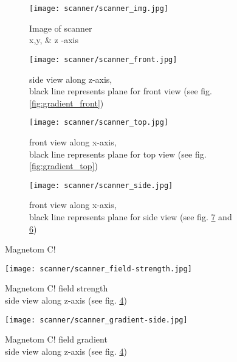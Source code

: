 \begin{figure}[!htb]
\centering
  \begin{subfigure}[b]{0.4\textwidth}
	\centering
	\texttt{[image: scanner/scanner\_img.jpg]}
	\caption{Image of scanner\\ x,y, \& z -axis}
	\label{fig:scanner_image}
  \end{subfigure}
    \hfill
  \begin{subfigure}[b]{0.4\textwidth}
  	\centering
    \texttt{[image: scanner/scanner\_front.jpg]}
    \caption{side view along z-axis,\\ black line represents plane for front view (see fig. \ref{fig:gradient_front})}
    \label{fig:scanner_front}
  \end{subfigure}
  
  \begin{subfigure}[b]{0.4\textwidth}
   	\centering
   	\texttt{[image: scanner/scanner\_top.jpg]}
   	\caption{front view along x-axis,\\ black line represents plane for top view (see fig. \ref{fig:gradient_top})}
   	\label{fig:scanner_top}
  \end{subfigure}
    \hfill
  \begin{subfigure}[b]{0.4\textwidth}
  	\centering
  	\texttt{[image: scanner/scanner\_side.jpg]}
  	\caption{front view along x-axis,\\ black line represents plane for side view (see fig. \ref{fig:gradient_side} and \ref{fig:strength_side})}
  	\label{fig:scanner_side}
  \end{subfigure}
  \caption{Magnetom C! \cite{magnetom_handbook}}
  \label{fig:scanner}
\end{figure}

\begin{figure}[!htb]
  	\centering
      \texttt{[image: scanner/scanner\_field-strength.jpg]}
      \caption{Magnetom C! field strength\\ side view along z-axis (see fig. \ref{fig:scanner_side}) \cite{magnetom_handbook}}
    \label{fig:strength_side}
\end{figure}

\begin{figure}[!htb]
    	\centering
        \texttt{[image: scanner/scanner\_gradient-side.jpg]}
        \caption{Magnetom C! field gradient\\ side view along z-axis (see fig. \ref{fig:scanner_side}) \cite{magnetom_handbook}}
        \label{fig:gradient_side}
\end{figure}

